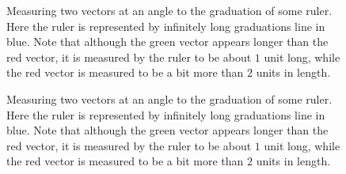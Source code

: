 \begin{figure}
    \begin{center}
    \end{center}
    \caption{Measuring two vectors at an angle to the graduation of some ruler. Here the ruler is represented by infinitely long graduations line in blue. Note that although the green vector appears longer than the red vector, it is measured by the ruler to be about $1$ unit long, while the red vector is measured to be a bit more than $2$ units in length.}
    \label{fig:ruler_measure_at_angle}
\end{figure}

\begin{figure}
    \begin{center}
    \end{center}
    \caption{Measuring two vectors at an angle to the graduation of some ruler. Here the ruler is represented by infinitely long graduations line in blue. Note that although the green vector appears longer than the red vector, it is measured by the ruler to be about $1$ unit long, while the red vector is measured to be a bit more than $2$ units in length.}
    \label{fig:ruler_measure_at_angle}
\end{figure}
